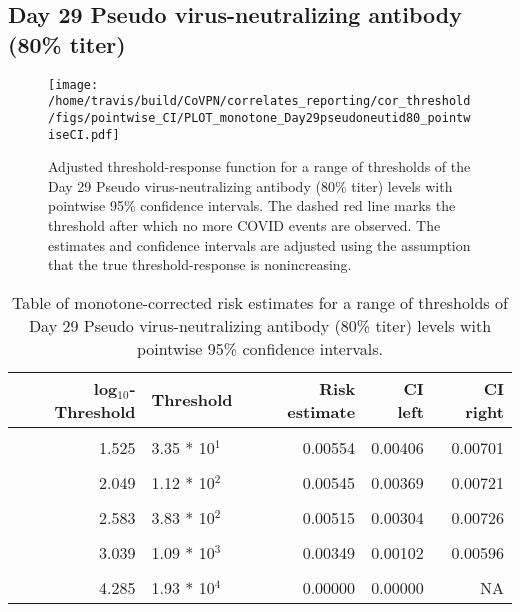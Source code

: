\documentclass[]{book}
\theoremstyle{definition}
\theoremstyle{definition}
\theoremstyle{definition}
\newcommand{\1}{\mathbbm{1}}
\begin{document}
\newpage

\newpage

\newpage

\hypertarget{day-29-pseudo-virus-neutralizing-antibody-80-titer-1}{%
\subsection{Day 29 Pseudo virus-neutralizing antibody (80\% titer)}\label{day-29-pseudo-virus-neutralizing-antibody-80-titer-1}}

\begin{figure}[H]
\centering
\texttt{[image: /home/travis/build/CoVPN/correlates\_reporting/cor\_threshold/figs/pointwise\_CI/PLOT\_monotone\_Day29pseudoneutid80\_pointwiseCI.pdf]}
\caption{Adjusted threshold-response function for a range of thresholds of the
  Day 29 Pseudo virus-neutralizing antibody (80\% titer) levels with pointwise 95\% confidence intervals. The dashed red line marks the threshold after which no more COVID events are observed. The estimates and confidence intervals are adjusted using the assumption that the true threshold-response is nonincreasing.}
\end{figure}
\begin{table}[!h]

\caption{\label{tab:unnamed-chunk-377}Table of monotone-corrected risk estimates for a range of thresholds of Day 29 Pseudo virus-neutralizing antibody (80\% titer) levels with pointwise 95\% confidence intervals.}
\centering
\begin{tabular}[t]{rlrrr}
\toprule
log$_{10}$-Threshold & Threshold & Risk estimate & CI left & CI right\\
\midrule
\cellcolor{gray!6}{0.699} & \cellcolor{gray!6}{5.00 * 10$^0$} & \cellcolor{gray!6}{0.00585} & \cellcolor{gray!6}{0.00442} & \cellcolor{gray!6}{0.00727}\\
1.525 & 3.35 * 10$^1$ & 0.00554 & 0.00406 & 0.00701\\
\cellcolor{gray!6}{1.840} & \cellcolor{gray!6}{6.92 * 10$^1$} & \cellcolor{gray!6}{0.00554} & \cellcolor{gray!6}{0.00386} & \cellcolor{gray!6}{0.00721}\\
2.049 & 1.12 * 10$^2$ & 0.00545 & 0.00369 & 0.00721\\
\cellcolor{gray!6}{2.276} & \cellcolor{gray!6}{1.89 * 10$^2$} & \cellcolor{gray!6}{0.00534} & \cellcolor{gray!6}{0.00343} & \cellcolor{gray!6}{0.00726}\\
2.583 & 3.83 * 10$^2$ & 0.00515 & 0.00304 & 0.00726\\
\cellcolor{gray!6}{2.785} & \cellcolor{gray!6}{6.10 * 10$^2$} & \cellcolor{gray!6}{0.00515} & \cellcolor{gray!6}{0.00244} & \cellcolor{gray!6}{0.00786}\\
3.039 & 1.09 * 10$^3$ & 0.00349 & 0.00102 & 0.00596\\
\cellcolor{gray!6}{3.351} & \cellcolor{gray!6}{2.24 * 10$^3$} & \cellcolor{gray!6}{0.00242} & \cellcolor{gray!6}{0.00005} & \cellcolor{gray!6}{0.00480}\\
4.285 & 1.93 * 10$^4$ & 0.00000 & 0.00000 & NA\\
\bottomrule
\end{tabular}
\end{table}
\end{document}
